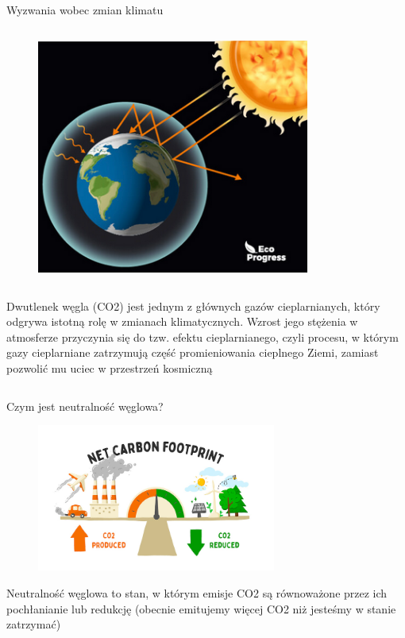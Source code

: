 \begin{columnframe}{Wyzwania wobec zmian klimatu}
    \begin{column}{0.5\textwidth}
        \begin{figure}
            \centering
            \includegraphics[width=0.8\textwidth, frame]{images/greenhouse_effect_stock_image.png}
        \end{figure}
    \end{column}
    \begin{column}{0.5\textwidth}
        Dwutlenek węgla (CO2) jest jednym z głównych gazów cieplarnianych, który odgrywa istotną rolę w zmianach klimatycznych. Wzrost jego stężenia w atmosferze przyczynia się do tzw. efektu cieplarnianego, czyli procesu, w którym gazy cieplarniane zatrzymują część promieniowania cieplnego Ziemi, zamiast pozwolić mu uciec w przestrzeń kosmiczną
    \end{column}
\end{columnframe}

\begin{frame}{Czym jest neutralność węglowa?}
    \begin{figure}
        \includegraphics[width=0.7\textwidth]{images/carbon_footprint_infographic.png}
    \end{figure}



    Neutralność węglowa to stan, w którym emisje CO2 są równoważone przez ich pochłanianie lub redukcję (obecnie emitujemy więcej CO2 niż jesteśmy w stanie zatrzymać)
\end{frame}

